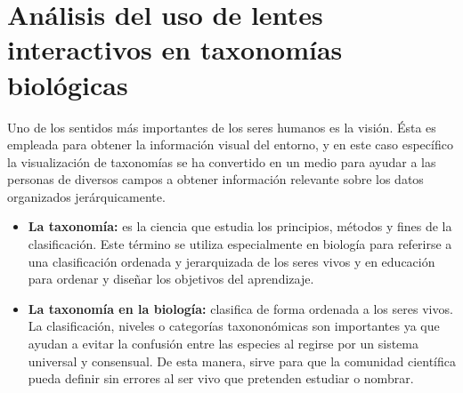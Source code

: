 \documentclass[journal]{IEEEtran}
\begin{document}
\section{Análisis del uso de lentes interactivos en taxonomías biológicas}

Uno de los sentidos más importantes de los seres humanos es la visión. 
Ésta es empleada para obtener la información visual del entorno, y en este caso específico la visualización de taxonomías se ha
 convertido en un medio para ayudar a las personas de diversos campos a obtener información relevante sobre los datos organizados jerárquicamente. 

 \begin{itemize}
  \item \textbf{La taxonomía:} es la ciencia que estudia los principios, métodos y fines de la clasificación. Este término se utiliza especialmente en biología para referirse a una clasificación ordenada y jerarquizada de los seres vivos y en educación para ordenar y diseñar los objetivos del aprendizaje. \cite{linne}
  \item \textbf{La taxonomía en la biología:} clasifica de forma ordenada a los seres vivos\cite{linne}. La clasificación, niveles o categorías taxononómicas son importantes ya que ayudan a evitar la confusión entre las especies al regirse por un sistema universal y consensual. De esta manera, sirve para que la comunidad científica pueda definir sin errores al ser vivo que pretenden estudiar o nombrar.
\end{itemize}
\end{document}
